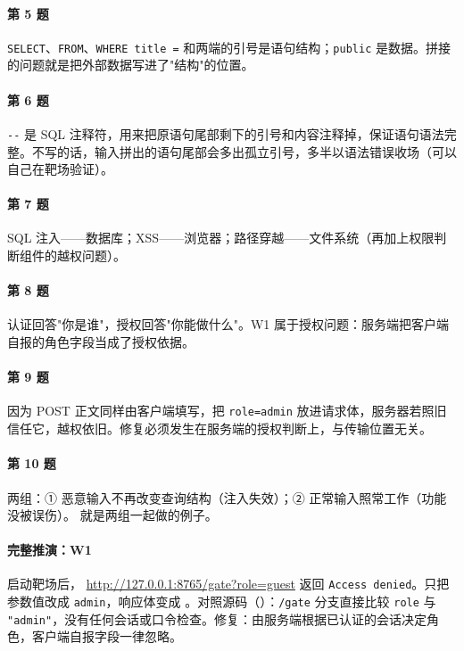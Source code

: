 \documentclass[UTF8,12pt,oneside]{ctexbook}
\begin{document}
\paragraph{第 5 题}\verb|SELECT|、\verb|FROM|、\verb|WHERE title =| 和两端的引号是语句结构；\verb|public| 是数据。拼接的问题就是把外部数据写进了"结构"的位置。

\paragraph{第 6 题}\verb|--| 是 SQL 注释符，用来把原语句尾部剩下的引号和内容注释掉，保证语句语法完整。不写的话，输入拼出的语句尾部会多出孤立引号，多半以语法错误收场（可以自己在靶场验证）。

\paragraph{第 7 题}SQL 注入——数据库；XSS——浏览器；路径穿越——文件系统（再加上权限判断组件的越权问题）。

\paragraph{第 8 题}认证回答"你是谁"，授权回答"你能做什么"。W1 属于授权问题：服务端把客户端自报的角色字段当成了授权依据。

\paragraph{第 9 题}因为 POST 正文同样由客户端填写，把 \verb|role=admin| 放进请求体，服务器若照旧信任它，越权依旧。修复必须发生在服务端的授权判断上，与传输位置无关。

\paragraph{第 10 题}两组：① 恶意输入不再改变查询结构（注入失效）；② 正常输入照常工作（功能没被误伤）。 就是两组一起做的例子。

\paragraph{完整推演：W1}
启动靶场后， \url{http://127.0.0.1:8765/gate?role=guest} 返回 \verb|Access denied|。只把参数值改成 \verb|admin|，响应体变成 。对照源码（）：\verb|/gate| 分支直接比较 \verb|role| 与 \verb|"admin"|，没有任何会话或口令检查。修复：由服务端根据已认证的会话决定角色，客户端自报字段一律忽略。
\end{document}

